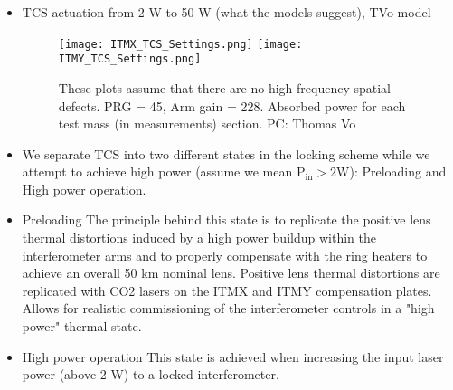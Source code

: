  
 \begin{itemize}
    \item TCS actuation from 2 W to 50 W (what the models suggest), TVo model 

\begin{figure}[H]
        \centering
            \texttt{[image: ITMX\_TCS\_Settings.png]}
            \texttt{[image: ITMY\_TCS\_Settings.png]}
            \caption{These plots assume that there are no high frequency spatial defects. PRG = 45, Arm gain = 228. Absorbed power for each test mass (in measurements) section. PC: Thomas Vo}
\end{figure}
    \item We separate TCS into two different states in the locking scheme while we attempt to achieve high power (assume we mean $\mathrm{P}_{\mathrm{in}} > 2 \mathrm{W}$): Preloading and High power operation. 

    \item Preloading
        \subitem The principle behind this state is to replicate the positive lens thermal distortions induced by a high power buildup within the interferometer arms and to properly compensate with the ring heaters to achieve an overall 50 km nominal lens. 
            \subsubitem Positive lens thermal distortions are replicated with CO2 lasers on the ITMX and ITMY compensation plates. 
        \subitem Allows for realistic commissioning of the interferometer controls in a "high power" thermal state.

    \item High power operation
        \subitem This state is achieved when increasing the input laser power (above 2 W) to a locked interferometer. 

\end{itemize}
